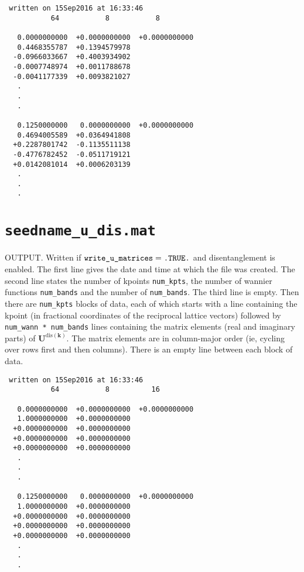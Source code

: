 \begin{verbatim}
 written on 15Sep2016 at 16:33:46 
           64           8           8
	 
   0.0000000000  +0.0000000000  +0.0000000000
   0.4468355787  +0.1394579978
  -0.0966033667  +0.4003934902
  -0.0007748974  +0.0011788678
  -0.0041177339  +0.0093821027
   .
   .
   .

   0.1250000000   0.0000000000  +0.0000000000
   0.4694005589  +0.0364941808
  +0.2287801742  -0.1135511138
  -0.4776782452  -0.0511719121
  +0.0142081014  +0.0006203139
   .
   .
   .
\end{verbatim}


\section{{\tt seedname\_u\_dis.mat}}

OUTPUT. Written if $\verb#write_u_matrices#=\verb#.TRUE.#$ and disentanglement is enabled.
The first line gives the date and time at which the file was created.
The second line states the number of kpoints {\tt num\_kpts}, the number of wannier
functions {\tt num\_bands} and the number of {\tt num\_bands}.
The third line is empty.
Then there are {\tt num\_kpts} blocks of data, each of which starts with a line containing the kpoint 
(in fractional coordinates of the reciprocal lattice vectors) 
followed by {\tt num\_wann * num\_bands} lines containing the matrix elements (real and imaginary parts)
of $\mathbf{U}^{\mathrm{dis}(\mathbf{k})}$.
The matrix elements are in column-major order (ie, cycling over rows first and then columns).
There is an empty line between each block of data.

\begin{verbatim}
 written on 15Sep2016 at 16:33:46 
           64           8          16
	    
   0.0000000000  +0.0000000000  +0.0000000000
   1.0000000000  +0.0000000000
  +0.0000000000  +0.0000000000
  +0.0000000000  +0.0000000000
  +0.0000000000  +0.0000000000
   .
   .
   .
   
   0.1250000000   0.0000000000  +0.0000000000
   1.0000000000  +0.0000000000
  +0.0000000000  +0.0000000000
  +0.0000000000  +0.0000000000
  +0.0000000000  +0.0000000000
   .
   .
   .
\end{verbatim}
